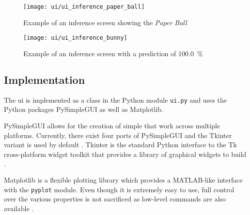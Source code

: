 \begin{figure}
  \centering
  \texttt{[image: ui/ui\_inference\_paper\_ball]}
  \caption{Example of an inference screen showing the \textit{Paper Ball}}
  \label{fig:ui_inference_paper_ball}
\end{figure}

\begin{figure}
  \centering
  \texttt{[image: ui/ui\_inference\_bunny]}
  \caption{Example of an inference screen with a prediction of \SI{100.0}{\percent}}
  \label{fig:ui_inference_bunny}
\end{figure}





\subsection{Implementation}
\label{subsec:inference:user_interface:implementation}

The \acrlong{ui} is implemented as a class in the Python module \texttt{ui.py} and uses the Python packages PySimpleGUI as well as Matplotlib.

PySimpleGUI allows for the creation of simple  that work across multiple platforms.
Currently, there exist four ports of PySimpleGUI and the Tkinter variant is used by default \cite{inf_pysimplegui}.
Tkinter is the standard Python interface to the Tk cross-platform widget toolkit that provides a library of graphical widgets to build  \cite{inf_tkinter}.

Matplotlib is a flexible plotting library which provides a MATLAB-like interface with the \texttt{pyplot} module.
Even though it is extremely easy to use, full control over the various properties is not sacrificed as low-level commands are also available \cite{inf_matplotlib}.


